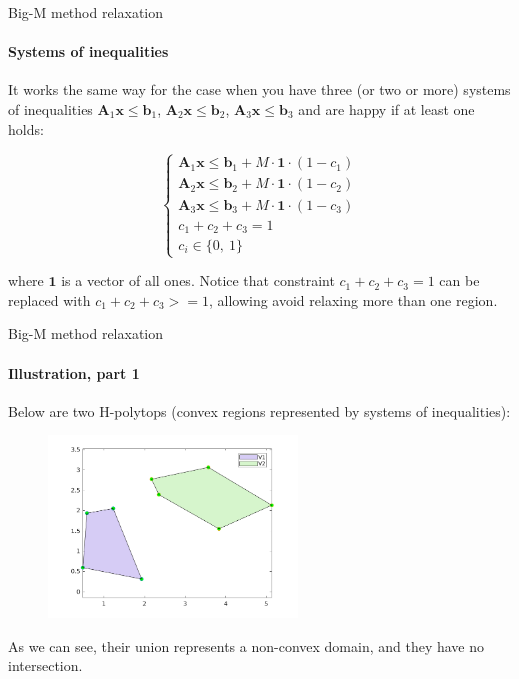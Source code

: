 \documentclass{beamer}
\begin{document}
\begin{frame}{Big-M method relaxation}
\framesubtitle{Systems of inequalities}
\begin{flushleft}

It works the same way for the case when you have three (or two or more) systems of inequalities $\mathbf{A}_1 \mathbf{x} \leq \mathbf{b}_1$, $\mathbf{A}_2 \mathbf{x} \leq \mathbf{b}_2$, $\mathbf{A}_3 \mathbf{x} \leq \mathbf{b}_3$ and are happy if at least one holds:

\begin{equation}
    \begin{cases}
    \mathbf{A}_1 \mathbf{x} \leq \mathbf{b}_1 + M \cdot \mathbf{1} \cdot (1 - c_1) \\
    \mathbf{A}_2 \mathbf{x} \leq \mathbf{b}_2 + M \cdot \mathbf{1} \cdot (1 - c_2) \\
    \mathbf{A}_3 \mathbf{x} \leq \mathbf{b}_3 + M \cdot \mathbf{1} \cdot (1 - c_3) \\
    c_1 + c_2 + c_3 = 1 \\
    c_i  \in \{0, \ 1 \}
    \end{cases}
\end{equation}

where $\mathbf{1}$ is a vector of all ones. Notice that constraint $c_1 + c_2 + c_3 = 1$ can be replaced with $c_1 + c_2 + c_3 >= 1$, allowing avoid relaxing more than one region.

\end{flushleft}
\end{frame}



\begin{frame}{Big-M method relaxation}
\framesubtitle{Illustration, part 1}
\begin{flushleft}

Below are two H-polytops (convex regions represented by systems of inequalities):

\begin{figure} [h!]
\begin{center}
\includegraphics[width=2.6in]{fig1.png}
\end{center} 
\end{figure}

As we can see, their union represents a non-convex domain, and they have no intersection.

\end{flushleft}
\end{frame}
\end{document}
